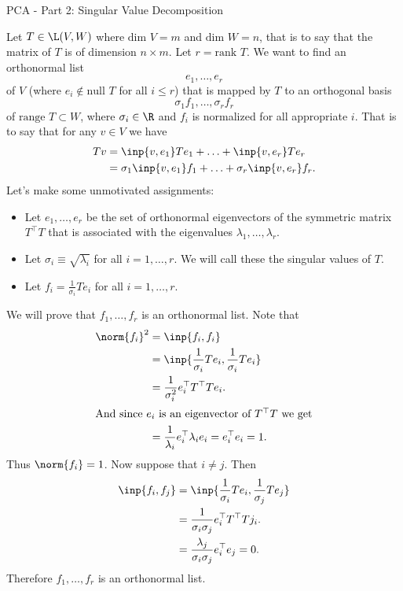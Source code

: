 \begin{entry}[3]{PCA - Part 2: Singular Value Decomposition}
\begin{entrysection}
\noindent Let $T \in \L(V, W)$ where $\text{dim } V = m$ and $\text{dim } W = n$, that is to say that the matrix of $T$ is of dimension $n \times m$. Let $r = \text{rank } T$. We want to find an orthonormal list \[e_1, \ldots, e_r\] of $V$ (where $e_i \not\in \text{null }T$ for all $i \leq r$) that is mapped by $T$ to an orthogonal basis \[\sigma_1 f_1, \ldots, \sigma_r f_r\] of $\text{range }T \subset W$, where $\sigma_i \in \R$ and $f_i$ is normalized for all appropriate $i$. That is to say that for any $v \in V$ we have
\begin{align*} 
  Tv &= \inp{v, e_1} Te_1 + \ldots + \inp{v, e_r} Te_r \\
  &= \sigma_1 \inp{v, e_1} f_1 + \ldots + \sigma_r \inp{v, e_r} f_r.
\end{align*} 
Let's make some unmotivated assignments:
\begin{itemize}
\item Let $e_1, \ldots, e_r$ be the set of orthonormal eigenvectors of the symmetric matrix $T^{\top}T$ that is associated with the eigenvalues $\lambda_1,\ldots,\lambda_r$.
\item Let $\sigma_i \equiv \sqrt{\lambda_i}$ for all $i = 1, \ldots, r$. We will call these the singular values of $T$.
\item Let $f_i = \frac{1}{\sigma_i} Te_i$ for all $i = 1, \ldots, r$.
\end{itemize}
We will prove that $f_1,\ldots,f_r$ is an orthonormal list. Note that
\begin{align*}
\norm{f_i}^2 &= \inp{f_i, f_i}\\
&= \inp{\frac{1}{\sigma_i} Te_i, \frac{1}{\sigma_i} Te_i}\\
&= \frac{1}{\sigma_i^2} e_i^{\top} T^{\top} T e_i.\\
\intertext{And since $e_i$ is an eigenvector of $T^{\top}T$ we get}
&=  \frac{1}{\lambda_i} e_i^{\top} \lambda_i e_i = e_i^{\top} e_i = 1.
\end{align*}
Thus $\norm{f_i} = 1$. Now suppose that $i \neq j$. Then
\begin{align*}
\inp{f_i, f_j} &= \inp{\frac{1}{\sigma_i} Te_i, \frac{1}{\sigma_j} Te_j}\\
&= \frac{1}{\sigma_i \sigma_j} e_i^{\top} T^{\top} T j_i.\\
&= \frac{\lambda_j}{\sigma_i \sigma_j} e_i^{\top} e_j = 0.
\end{align*}
Therefore $f_1, \ldots, f_r$ is an orthonormal list. \\


\end{entrysection}
\end{entry}
